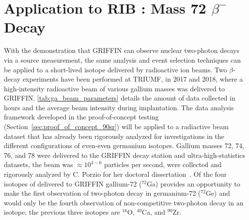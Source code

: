 \documentclass[cnatzke_thesis_proposal.tex]{subfiles}
\begin{document}
\chapter{Application to RIB : Mass 72 $\beta^-$ Decay}

With the demonstration that GRIFFIN can observe nuclear two-photon decays via a source measurement, the same analysis and event selection techniques can be applied to a short-lived isotope delivered by radioactive ion beams. 
Two $\beta$-decay experiments have been performed at TRIUMF, in 2017 and 2018, where a high-intensity radioactive beam of various gallium masses was delivered to GRIFFIN. 
\ref{tab:ga_beam_parameters} details the amount of data collected in hours and the average beam intensity during implantation.
The data analysis framework developed in the proof-of-concept testing (Section~\ref{sec:proof_of_concept_90sr}) will be applied to a radiactive beam dataset that has already been rigorously analyzed for investigations in the different configurations of even-even germanium isotopes.
Gallium masses 72, 74, 76, and 78 were delivered to the GRIFFIN decay station and ultra-high-statistics datasets, the beam was $\approx 10^{4-6}$ particles per second, were collected and rigorously analyzed by C. Porzio for her doctoral dissertation~\cite{porzio_configuration_2021}.
Of the four isotopes of delivered to GRIFFIN gallium-72 ($^{72}$Ga) provides an opportunity to make the first observation of two-photon decay in germanium-72 ($^{72}$Ge) and would only be the fourth observation of non-competitive two-photon decay in an isotope; the previous three isotopes are $^{16}$O, $^{40}$Ca, and $^{90}$Zr.
\end{document}
